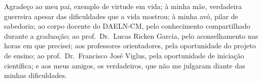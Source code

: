 Agradeço ao meu pai, exemplo de virtude em vida; à minha mãe, verdadeira guerreira apesar das dificuldades que a vida mostrou; à minha avó, pilar de sabedoria; ao corpo docente do DAELN-CM, pelo conhecimento compartilhado durante a graduação; ao prof.\ Dr.\ Lucas Ricken Garcia, pelo aconselhamento nas horas em que precisei; aos professores orientadores, pela oportunidade do projeto de ensino; ao prof.\ Dr.\ Francisco José Viglus, pela oportunidade de iniciação científica; e aos meus amigos, os verdadeiros, que não me julgaram diante das minhas dificuldades.
